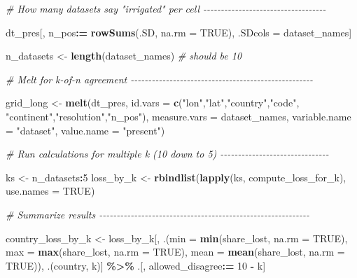 \documentclass[
  11pt,
]{article}
\newenvironment{Shaded}{\begin{snugshade}}{\end{snugshade}}
\newcommand{\AttributeTok}[1]{\textcolor[rgb]{0.13,0.29,0.53}{#1}}
\newcommand{\CommentTok}[1]{\textcolor[rgb]{0.56,0.35,0.01}{\textit{#1}}}
\newcommand{\ConstantTok}[1]{\textcolor[rgb]{0.56,0.35,0.01}{#1}}
\newcommand{\DecValTok}[1]{\textcolor[rgb]{0.00,0.00,0.81}{#1}}
\newcommand{\FunctionTok}[1]{\textcolor[rgb]{0.13,0.29,0.53}{\textbf{#1}}}
\newcommand{\NormalTok}[1]{#1}
\newcommand{\OtherTok}[1]{\textcolor[rgb]{0.56,0.35,0.01}{#1}}
\newcommand{\SpecialCharTok}[1]{\textcolor[rgb]{0.81,0.36,0.00}{\textbf{#1}}}
\newcommand{\StringTok}[1]{\textcolor[rgb]{0.31,0.60,0.02}{#1}}
\begin{document}
\begin{Shaded}
\begin{Highlighting}[]
\CommentTok{\# How many datasets say "irrigated" per cell {-}{-}{-}{-}{-}{-}{-}{-}{-}{-}{-}{-}{-}{-}{-}{-}{-}{-}{-}{-}{-}{-}{-}{-}{-}{-}{-}{-}{-}{-}{-}{-}{-}{-}{-}}

\NormalTok{dt\_pres[, n\_pos}\SpecialCharTok{:=} \FunctionTok{rowSums}\NormalTok{(.SD, }\AttributeTok{na.rm =} \ConstantTok{TRUE}\NormalTok{), .SDcols }\OtherTok{=}\NormalTok{ dataset\_names]}

\NormalTok{n\_datasets }\OtherTok{\textless{}{-}} \FunctionTok{length}\NormalTok{(dataset\_names)  }\CommentTok{\# should be 10}

\CommentTok{\# Melt for k{-}of{-}n agreement {-}{-}{-}{-}{-}{-}{-}{-}{-}{-}{-}{-}{-}{-}{-}{-}{-}{-}{-}{-}{-}{-}{-}{-}{-}{-}{-}{-}{-}{-}{-}{-}{-}{-}{-}{-}{-}{-}{-}{-}{-}{-}{-}{-}{-}{-}{-}{-}{-}{-}{-}{-}}

\NormalTok{grid\_long }\OtherTok{\textless{}{-}} \FunctionTok{melt}\NormalTok{(dt\_pres, }\AttributeTok{id.vars =} \FunctionTok{c}\NormalTok{(}\StringTok{"lon"}\NormalTok{,}\StringTok{"lat"}\NormalTok{,}\StringTok{"country"}\NormalTok{,}\StringTok{"code"}\NormalTok{,}
                    \StringTok{"continent"}\NormalTok{,}\StringTok{"resolution"}\NormalTok{,}\StringTok{"n\_pos"}\NormalTok{),}
                  \AttributeTok{measure.vars =}\NormalTok{ dataset\_names,}
                  \AttributeTok{variable.name =} \StringTok{"dataset"}\NormalTok{,}
                  \AttributeTok{value.name =} \StringTok{"present"}\NormalTok{)}

\CommentTok{\# Run calculations for multiple k (10 down to 5) {-}{-}{-}{-}{-}{-}{-}{-}{-}{-}{-}{-}{-}{-}{-}{-}{-}{-}{-}{-}{-}{-}{-}{-}{-}{-}{-}{-}{-}{-}{-}}

\NormalTok{ks }\OtherTok{\textless{}{-}}\NormalTok{ n\_datasets}\SpecialCharTok{:}\DecValTok{5}
\NormalTok{loss\_by\_k }\OtherTok{\textless{}{-}} \FunctionTok{rbindlist}\NormalTok{(}\FunctionTok{lapply}\NormalTok{(ks, compute\_loss\_for\_k), }\AttributeTok{use.names =} \ConstantTok{TRUE}\NormalTok{)}

\CommentTok{\# Summarize results {-}{-}{-}{-}{-}{-}{-}{-}{-}{-}{-}{-}{-}{-}{-}{-}{-}{-}{-}{-}{-}{-}{-}{-}{-}{-}{-}{-}{-}{-}{-}{-}{-}{-}{-}{-}{-}{-}{-}{-}{-}{-}{-}{-}{-}{-}{-}{-}{-}{-}{-}{-}{-}{-}{-}{-}{-}{-}{-}{-}}

\NormalTok{country\_loss\_by\_k }\OtherTok{\textless{}{-}}\NormalTok{ loss\_by\_k[, .(}\AttributeTok{min  =} \FunctionTok{min}\NormalTok{(share\_lost,  }\AttributeTok{na.rm =} \ConstantTok{TRUE}\NormalTok{),}
                                   \AttributeTok{max  =} \FunctionTok{max}\NormalTok{(share\_lost,  }\AttributeTok{na.rm =} \ConstantTok{TRUE}\NormalTok{),}
                                   \AttributeTok{mean =} \FunctionTok{mean}\NormalTok{(share\_lost, }\AttributeTok{na.rm =} \ConstantTok{TRUE}\NormalTok{)),}
\NormalTok{                               .(country, k)] }\SpecialCharTok{\%\textgreater{}\%}
\NormalTok{  .[, allowed\_disagree}\SpecialCharTok{:=} \DecValTok{10} \SpecialCharTok{{-}}\NormalTok{ k]}


\end{Highlighting}
\end{Shaded}
\end{document}
